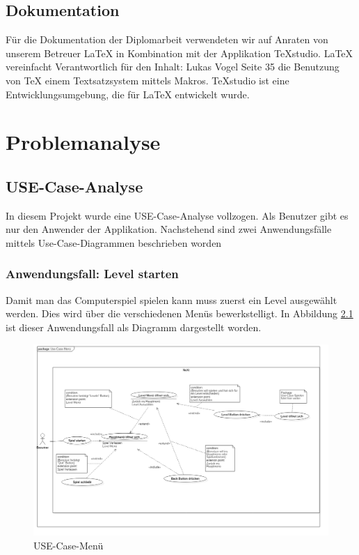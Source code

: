 \section{Dokumentation}
Für die Dokumentation der Diplomarbeit verwendeten wir auf Anraten von unserem Betreuer LaTeX in Kombination mit der Applikation TeXstudio. LaTeX vereinfacht
Verantwortlich für den Inhalt: Lukas Vogel	Seite 35 die Benutzung von TeX einem Textsatzsystem mittels Makros. TeXstudio ist eine Entwicklungsumgebung, die für LaTeX entwickelt wurde.
 \cite{Latex}
\chapter{Problemanalyse}
\section{USE-Case-Analyse}
\def \currentAuthor {Lukas Vogel}
In diesem Projekt wurde eine USE-Case-Analyse vollzogen. Als Benutzer gibt es nur den Anwender der Applikation. Nachstehend sind zwei Anwendungsfälle mittels Use-Case-Diagrammen beschrieben worden
\subsection{Anwendungsfall: Level starten}
Damit man das Computerspiel spielen kann muss zuerst ein Level ausgewählt werden. Dies wird über die verschiedenen Menüs bewerkstelligt. In Abbildung \ref{USE-Case-Menu} ist dieser Anwendungsfall als Diagramm dargestellt worden. 
\begin{figure}[H]
	\centering
	\includegraphics[angle=90,scale=0.45]{images/UseCaseMenu.png}
	\caption{USE-Case-Menü}
	\label{USE-Case-Menu}
\end{figure}

